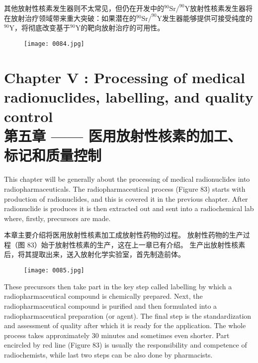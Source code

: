 \documentclass[dvipsnames, svgnames,a4paper,11pt]{article}
\begin{document}
其他放射性核素发生器则不太常见，但仍在开发中的$^{90}\text{Sr}/^{90}\text{Y}$放射性核素发生器将在放射治疗领域带来重大突破：如果潜在的$^{90}\text{Sr}/^{90}\text{Y}$发生器能够提供可接受纯度的$^{90}\text{Y}$，将彻底改变基于$^{90}\text{Y}$的靶向放射治疗的可用性。

\begin{figure}[H]
      \centering
      \texttt{[image: 0084.jpg]}
       \label{fig82}
\end{figure}

\newpage


\section{Chapter V : Processing of medical radionuclides, labelling, and quality control\\第五章 —— 医用放射性核素的加工、标记和质量控制}
This chapter will be generally about the processing of medical radionuclides into
radiopharmaceuticals. The radiopharmaceutical process (Figure 83) starts with
production of radionuclides, and this is covered it in the previous chapter. After
radionuclide is produces it is then extracted out and sent into a radiochemical lab
where, firstly, precursors are made.

本章主要介绍将医用放射性核素加工成放射性药物的过程。 放射性药物的生产过程（图 83）始于放射性核素的生产，这在上一章已有介绍。 生产出放射性核素后，将其提取出来，送入放射化学实验室，首先制造前体。

\begin{figure}[H]
    \centering
    \texttt{[image: 0085.jpg]}
     \label{fig83}
\end{figure}

These precursors then take part in the key step called labelling by which a
radiopharmaceutical compound is chemically prepared. Next, the
radiopharmaceutical compound is purified and then formulated into a
radiopharmaceutical preparation (or agent). The final step is the standardization and
assessment of quality after which it is ready for the application. The whole process
takes approximately 30 minutes and sometimes even shorter. Part encircled by red
line (Figure 83) is usually the responsibility and competence of radiochemists, while
last two steps can be also done by pharmacists.
\end{document}

